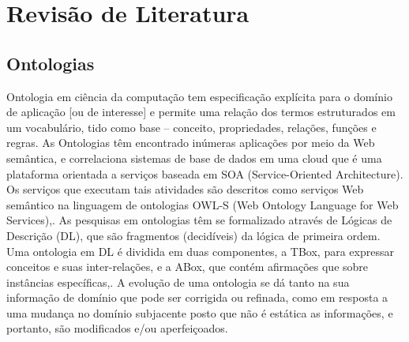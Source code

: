 
\part{Revisão de Literatura}


\chapter[Ontologias]{Ontologias}


Ontologia em ciência da computação tem especificação explícita para o domínio de
aplicação [ou de interesse] e permite uma relação dos termos estruturados em um
vocabulário, tido como base – conceito, propriedades, relações, funções e
regras. As Ontologias têm encontrado inúmeras aplicações por meio da Web
semântica, e correlaciona sistemas de base de dados em uma cloud que é uma
plataforma orientada a serviços baseada em SOA (Service-Oriented Architecture).
Os serviços que executam tais atividades são descritos como serviços Web
semântico  na linguagem de ontologias OWL-S (Web Ontology Language for Web
Services),. As pesquisas em ontologias têm se
formalizado através de Lógicas de Descrição (DL), que são fragmentos
(decidíveis) da lógica de primeira ordem. Uma ontologia em DL é dividida em duas
componentes, a TBox, para expressar conceitos e suas inter-relações, e a ABox,
que contém afirmações que sobre instâncias
específicas,. A evolução de uma ontologia se dá
tanto na sua informação de domínio que pode ser corrigida ou refinada, como em
resposta a uma mudança no domínio subjacente posto que não é estática as
informações, e portanto, são modificados e/ou aperfeiçoados.

